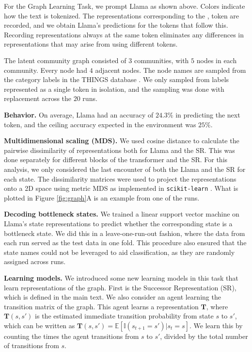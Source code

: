 \documentclass{article} %
\begin{document}
For the Graph Learning Task, we prompt Llama as shown above. Colors indicate how the text is tokenized. The representations corresponding to the \colorbox{token2}{,} token are recorded, and we obtain Llama's predictions for the tokens that follow this. Recording representations always at the same token eliminates any differences in representations that may arise from using different tokens.

The latent community graph consisted of $3$ communities, with $5$ nodes in each community. Every node had $4$ adjacent nodes. The node names are sampled from the category labels in the THINGS database \citep{hebart_things_2019}. We only sampled from labels represented as a single token in isolation, and the sampling was done with replacement across the $20$ runs.

\textbf{Behavior.} On average, Llama had an accuracy of $24.3\%$ in predicting the next token, and the ceiling accuracy expected in the environment was $25\%$.

\textbf{Multidimensional scaling (MDS).} We used cosine distance to calculate the pairwise dissimilarity of representations both for Llama and the SR. This was done separately for different blocks of the transformer and the SR. For this analysis, we only considered the last encounter of both the Llama and the SR for each state. The dissimilarity matrices were used to project the representations onto a 2D space using metric MDS as implemented in \texttt{scikit-learn} \citep{pedregosa2011scikit}. What is plotted in Figure \ref{fig:graph}A is an example from one of the runs.

\textbf{Decoding bottleneck states.} We trained a linear support vector machine on Llama's state representations to predict whether the corresponding state is a bottleneck state. We did this in a leave-one-run-out fashion, where the data from each run served as the test data in one fold. This procedure also ensured that the state names could not be leveraged to aid classification, as they are randomly assigned across runs.

\textbf{Learning models.} We introduced some new learning models in this task that learn representations of the graph. First is the Successor Representation (SR)\citep{dayan_improving_1993}, which is defined in the main text. We also consider an agent learning the transition matrix of the graph. This agent learns a representation $\mathbf{T}$, where $\mathbf{T}(s, s')$ is the estimated immediate transition probability from state $s$ to $s'$, which can be written as $\mathbf{T}(s, s') = \mathbb{E}[\mathbb{I}(s_{t+1} = s') | s_t = s]$. We learn this by counting the times the agent transitions from $s$ to $s'$, divided by the total number of transitions from $s$.
\end{document}
